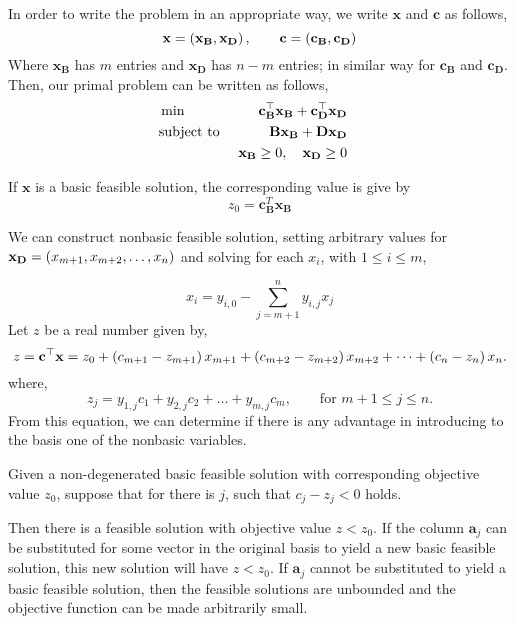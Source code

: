 In order to write the problem in an appropriate way, we write $\mathbf{x}$ and $\mathbf{c}$ as follows,
\begin{equation}
	\mathbf{x}=\left( \mathbf{x}_\mathbf{B}, \mathbf{x}_{\mathbf{D}} \right), \qquad \mathbf{c}=\left( \mathbf{c}_{\mathbf{B}}, \mathbf{c}_{\mathbf D} \right)
\end{equation}
Where $\mathbf{x}_{\mathbf{B}}$ has $m$ entries and $\mathbf{x}_{\mathbf{D}}$ has $n-m$ entries; in similar way for $\mathbf{c}_{\mathbf{B}}$ and $\mathbf{c}_{\mathbf D}$. Then, our primal problem can be written as follows,
\begin{align*}
	&\min &\mathbf{c}_{\mathbf{B}}^\top\mathbf{x}_{\mathbf{B}} + \mathbf{c}_\mathbf{D}^\top \mathbf{x}_\mathbf{D}&\\
	&\text{subject to }  &\mathbf{B}\mathbf{x}_{\mathbf{B}}+\mathbf{D}\mathbf{x}_{\mathbf{D}}& &\\
	& &\mathbf{x}_{\mathbf{B}}\geq 0, \quad \mathbf{x}_{\mathbf{D}}\geq 0 & &
\end{align*}


If $\mathbf{x}$ is a basic feasible solution, the corresponding value is give by
\begin{equation*}
	z_0=\mathbf{c}_{\mathbf{B}}^T\mathbf{x}_{\mathbf{B}}
\end{equation*}

We can construct nonbasic feasible solution, setting arbitrary values for $\mathbf{x}_{\mathbf{D}}=\left( x_{m+1}, x_{m+2},\dots, x_{n} \right)$ and solving for each $x_i$, with $1\leq i\leq m$,

\begin{equation*}
	x_i=y_{i,0}-\sum_{j=m+1}^{n} y_{i,j}x_{j}
\end{equation*}
Let $z$ be a real number given by,
\begin{equation}
	z=\mathbf{c}^\top \mathbf{x}=z_0+\left( c_{m+1}-z_{m+1} \right)x_{m+1}+\left( c_{m+2}-z_{m+2} \right)x_{m+2}+\dots+\left( c_{n}-z_{n} \right)x_{n}.  \label{eq: cost after pivot}
\end{equation}
where,
\begin{equation}
	z_{j}=y_{1,j}c_1+y_{2,j} c_2 +\dots +y_{m,j}c_{m}, \qquad \text{for } m+1\leq j\leq n. \label{eq: i cost after pivot}
\end{equation}
From this equation, we can determine if there is any advantage in introducing to the basis one of the nonbasic variables.
\begin{theorem}

Given a non-degenerated basic feasible solution with corresponding objective value $z_0$, suppose that for there is $j$, such that $c_j − z_j < 0$ holds. 

Then there is a feasible solution with objective value $z < z_0$. If the column $\mathbf{a}_j$ can be substituted for some vector in the original basis to yield a new basic feasible solution, this new solution will have $z<z_0$. If $\mathbf{a}_j$ cannot be substituted to yield a basic feasible solution, then the feasible solutions are unbounded and the objective function can be made arbitrarily small.
\end{theorem}



